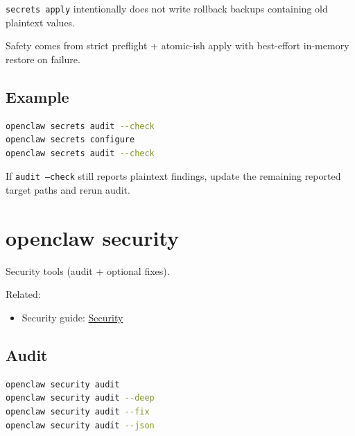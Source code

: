 \texttt{secrets apply} intentionally does not write rollback backups containing old plaintext values.

Safety comes from strict preflight + atomic-ish apply with best-effort in-memory restore on failure.

\subsection{Example}


\begin{lstlisting}[language=bash]
openclaw secrets audit --check
openclaw secrets configure
openclaw secrets audit --check
\end{lstlisting}


If \texttt{audit --check} still reports plaintext findings, update the remaining reported target paths and rerun audit.


\clearpage

\section{openclaw security}


Security tools (audit + optional fixes).

Related:

\begin{itemize}
  \item Security guide: \href{/gateway/security}{Security}
\end{itemize}


\subsection{Audit}


\begin{lstlisting}[language=bash]
openclaw security audit
openclaw security audit --deep
openclaw security audit --fix
openclaw security audit --json
\end{lstlisting}


